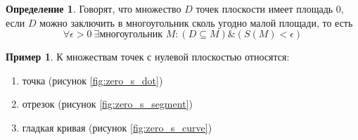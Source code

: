 \documentclass[a4paper, 14pt]{report}
\theoremstyle{definition}
\newtheorem*{definition}{Определение}
\newtheorem*{example}{Пример}
\begin{document}
		\begin{definition}
			Говорят, что множество $D$ точек плоскости имеет площадь 0, если $D$ можно заключить в многоугольник сколь угодно малой площади, то есть
			\begin{equation}
				\forall\epsilon>0~\exists\text{многоугольник }M:(D\subseteq M) \& (S(M)<\epsilon)
			\end{equation}
		\end{definition}		
	
		\begin{example}
			К множествам точек с нулевой плоскостью относятся:
			\begin{enumerate}
				\item точка (рисунок \ref{fig:zero_s_dot})
				\item отрезок (рисунок \ref{fig:zero_s_segment})
				\item гладкая кривая (рисунок \ref{fig:zero_s_curve})
			\end{enumerate}
		

\end{example}
\end{document}
